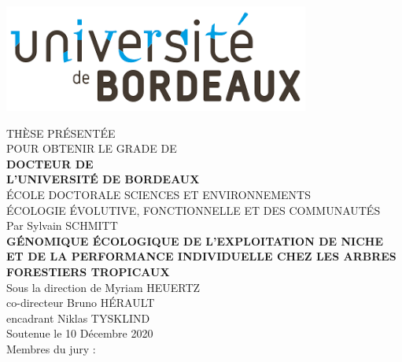 \includegraphics[width=0.3\columnwidth]{images/UB.png}

\begin{center}
  \normalsize{THÈSE PRÉSENTÉE} \\
  \normalsize{POUR OBTENIR LE GRADE DE} \\
  \vspace*{\fill}
  \Large{\textbf{DOCTEUR DE}} \\
  \Large{\textbf{L'UNIVERSITÉ DE BORDEAUX}} \\
  \vspace*{\fill}
  \normalsize{ÉCOLE DOCTORALE SCIENCES ET ENVIRONNEMENTS} \\
  \normalsize{ÉCOLOGIE ÉVOLUTIVE, FONCTIONNELLE ET DES COMMUNAUTÉS} \\
  \vspace*{\fill}
  \normalsize{Par Sylvain SCHMITT} \\
  \vspace*{\fill}
  \Large{\textbf{GÉNOMIQUE ÉCOLOGIQUE DE L'EXPLOITATION DE NICHE ET DE LA PERFORMANCE INDIVIDUELLE CHEZ LES ARBRES FORESTIERS TROPICAUX}} \\
  \vspace*{\fill}
  \normalsize{Sous la direction de Myriam HEUERTZ} \\
  \normalsize{co-directeur Bruno HÉRAULT} \\
  \normalsize{encadrant Niklas TYSKLIND} \\
  \vspace*{\fill}
  \normalsize{Soutenue le 10 Décembre 2020} \\
  \vspace*{\fill}
  \normalsize{Membres du jury :} \\
  \vspace*{\fill}
  \begin{table}[b]
    \centering
\end{table}
\end{center}
